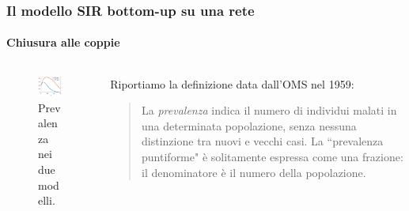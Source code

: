 \documentclass{beamer}
\theoremstyle{definition}
\theoremstyle{plain}
\begin{document}
\begin{frame}
\frametitle{Il modello SIR bottom-up su una rete}
\framesubtitle{Chiusura alle coppie}
\begin{columns}
\begin{column}{0.5\textwidth}
\begin{figure}
    \centering
    \includegraphics[scale=0.8]{Figure/Coppie_Prevalenza}
    \caption{Prevalenza nei  due modelli. }
\end{figure}
    \end{column}
    \begin{column}{0.5\textwidth}
    Riportiamo la definizione data dall'OMS nel 1959:
    \begin{quote}La \textit{prevalenza} indica il numero di individui malati in una determinata popolazione, senza nessuna distinzione tra nuovi e vecchi casi. La ``prevalenza puntiforme"  \`e solitamente espressa come una frazione: il denominatore \`e il numero della
    popolazione.	
    \end{quote}
    \end{column}
\end{columns}
\end{frame}
\end{document}
